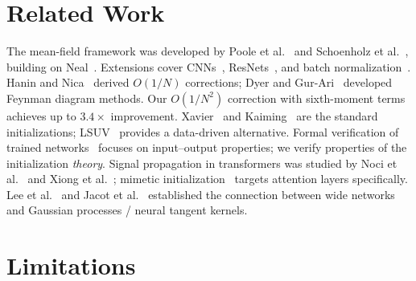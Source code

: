 \documentclass[10pt]{article}
\begin{document}
\section{Related Work}
\label{sec:related}

The mean-field framework was developed by Poole et al.~\cite{poole2016exponential} and Schoenholz et al.~\cite{schoenholz2017deep}, building on Neal~\cite{neal1996bayesian}.
Extensions cover CNNs~\cite{xiao2018dynamical}, ResNets~\cite{yang2017mean}, and batch normalization~\cite{yang2019mean}.
Hanin and Nica~\cite{hanin2018neural,hanin2020finite} derived $O(1/N)$ corrections; Dyer and Gur-Ari~\cite{dyer2020asymptotics} developed Feynman diagram methods.
Our $O(1/N^2)$ correction with sixth-moment terms achieves up to $3.4\times$ improvement.
Xavier~\cite{glorot2010understanding} and Kaiming~\cite{he2015delving} are the standard initializations; LSUV~\cite{mishkin2016all} provides a data-driven alternative.
Formal verification of trained networks~\cite{katz2017reluplex,huang2017safety,singh2019abstract} focuses on input--output properties; we verify properties of the initialization \emph{theory}.
Signal propagation in transformers was studied by Noci et al.~\cite{noci2022signal} and Xiong et al.~\cite{he2020layer}; mimetic initialization~\cite{trockman2023mimetic} targets attention layers specifically.
Lee et al.~\cite{lee2018deep} and Jacot et al.~\cite{jacot2018neural} established the connection between wide networks and Gaussian processes / neural tangent kernels.

\section{Limitations}
\label{sec:limitations}
\end{document}
